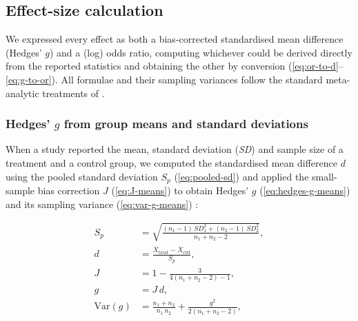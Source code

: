 %
%
%

\subsection{Effect-size calculation}

We expressed every effect as both a bias-corrected standardised mean
difference (Hedges' $g$) and a (log) odds ratio, computing whichever could
be derived directly from the reported statistics and obtaining the other by
conversion (\autoref{eq:or-to-d}--\autoref{eq:g-to-or}). All formulae and
their sampling variances follow the standard meta-analytic treatments of
\citet{borensteinIntroductionMetaanalysis2011}.

\subsubsection{Hedges' $g$ from group means and standard deviations}

When a study reported the mean, standard deviation (\textit{SD}) and sample
size of a treatment and a control group, we computed the standardised mean
difference $d$ using the pooled standard deviation $S_{p}$
(\autoref{eq:pooled-sd}) and applied the small-sample bias correction $J$
(\autoref{eq:J-means}) to obtain Hedges' $g$ (\autoref{eq:hedges-g-means})
and its sampling variance (\autoref{eq:var-g-means})
\citep{borensteinIntroductionMetaanalysis2011}:

\begin{align}
  S_{p}      &= \sqrt{\frac{(n_{1}-1)\,SD_{1}^{2} + (n_{2}-1)\,SD_{2}^{2}}{n_{1}+n_{2}-2}}, \label{eq:pooled-sd} \\[4pt]
  d          &= \frac{\bar{X}_{\text{treat}} - \bar{X}_{\text{ctrl}}}{S_{p}}, \label{eq:d-means} \\[4pt]
  J          &= 1 - \frac{3}{4(n_{1}+n_{2}-2) - 1}, \label{eq:J-means} \\[4pt]
  g          &= J \, d, \label{eq:hedges-g-means} \\[4pt]
  \mathrm{Var}(g) &= \frac{n_{1}+n_{2}}{n_{1}\,n_{2}} + \frac{g^{2}}{2(n_{1}+n_{2}-2)}, \label{eq:var-g-means}
\end{align}

